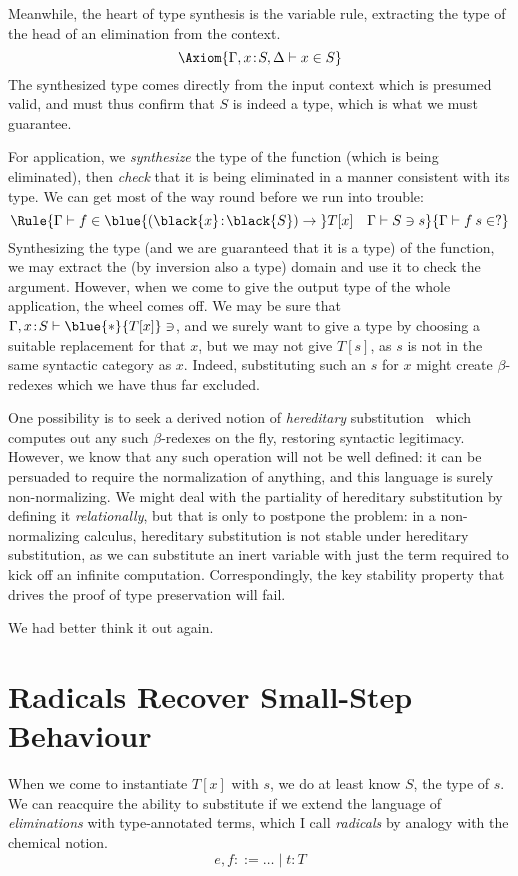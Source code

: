 \documentclass[natbib]{article}
\newcommand{\type}{\blue{\ast}}
\newcommand{\hb}{\!:\!}
\newcommand{\PI}[2]{\blue{(\black{#1}\hb \black{#2})\to\;}}
\begin{document}
Meanwhile, the heart of type synthesis is the variable rule, extracting the type of the head of an elimination from the context.
\[
\Axiom{\SYN{\Gamma,x\hb S,\Delta}{x}{S}}
\]
The synthesized type comes directly from the input context which is presumed valid, and must thus confirm that $S$ is indeed a type, which is what we must guarantee.

For application, we \emph{synthesize} the type of the function (which is being eliminated), then \emph{check} that it is being eliminated in a manner consistent with its type.
We can get most of the way round before we run into trouble:
\[
\Rule{\SYN\Gamma f {\PI xS T[x]} \quad \CHK\Gamma Ss}
     {\SYN\Gamma{f\:s}{?}}
\]
Synthesizing the type (and we are guaranteed that it is a type) of the function, we may extract the (by inversion also a type) domain and use it to check the argument. However, when we come to give the output type of the whole application, the wheel comes off. We may be sure that $\CHK{\Gamma,x\hb S}\type{T[x]}$, and we surely want to give a type by choosing a suitable replacement for that $x$, but we may not give $T[s]$, as $s$ is not in the same syntactic category as $x$. Indeed, substituting such an $s$ for $x$ might create $\beta$-redexes which we have thus far excluded.

One possibility is to seek a derived notion of \emph{hereditary}
substitution~\cite{DBLP:conf/types/WatkinsCPW03} which computes out
any such $\beta$-redexes on the fly, restoring syntactic
legitimacy. However, we know that any such operation will not be well
defined: it can be persuaded to require the normalization of
anything, and this language is surely non-normalizing. We might deal
with the partiality of hereditary substitution by defining it
\emph{relationally}, but that is only to postpone the problem: in a
non-normalizing calculus, hereditary substitution is not stable under
hereditary substitution, as we can substitute an inert variable with
just the term required to kick off an infinite
computation. Correspondingly, the key stability property that drives
the proof of type preservation will fail.

We had better think it out again.


\section{Radicals Recover Small-Step Behaviour}

When we come to instantiate $T[x]$ with $s$, we do at least know $S$, the type of $s$. We can reacquire the ability to substitute if we extend the language of \emph{eliminations} with type-annotated terms, which I call \emph{radicals} by analogy with the chemical notion.
\[
e,f ::= \ldots \;|\; t\hb T
\]
\end{document}
